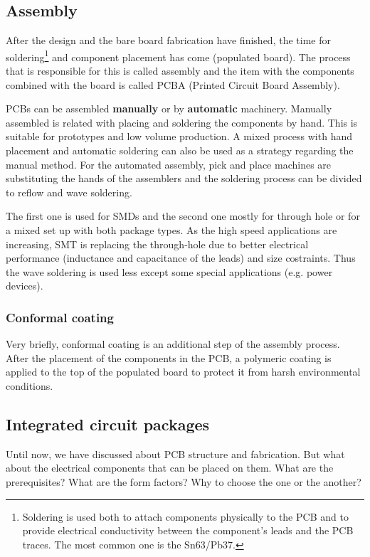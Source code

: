\documentclass[final]{cubedoc}
\begin{document}
	\subsection{Assembly}
	
	After the design and the bare board fabrication have finished, the time for soldering\footnote{Soldering is used both to attach components physically to the PCB and to provide electrical conductivity between the component’s leads and the PCB traces. The most common one is the Sn63/Pb37.} and component placement has come (populated board). The process that is responsible for this is called assembly and the item with the components combined with the board is called PCBA (Printed Circuit Board Assembly).
	
	PCBs can be assembled \textbf{manually} or by \textbf{automatic} machinery. Manually assembled is related with placing and soldering the components by hand. This is suitable for prototypes and low volume production. A mixed process with hand placement and automatic soldering can also be used as a strategy regarding the manual method. For the automated assembly, pick and place machines are substituting the hands of the assemblers and the soldering process can be divided to reflow and wave soldering. 
	
	The first one is used for SMDs and the second one mostly for through hole or for a mixed set up with both package types. 
	As the high speed applications are increasing, SMT is replacing the through-hole due to better electrical performance (inductance and capacitance of the leads) and size costraints. Thus the wave soldering is used less except some special applications (e.g. power devices).
	
	\subsubsection{Conformal coating}
	
	Very briefly, conformal coating is an additional step of the assembly process. After the placement of the components in the PCB, a polymeric coating is applied to the top of the populated board to protect it from harsh environmental conditions.
	
	\subsection{Integrated circuit packages}
	
	Until now, we have discussed about PCB structure and fabrication. But what about the electrical components that can be placed on them. What are the prerequisites? What are the form factors? Why to choose the one or the another?
	
\end{document}
